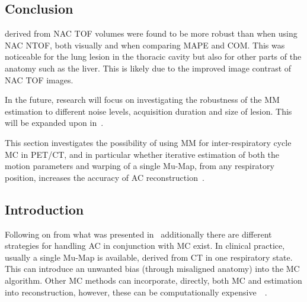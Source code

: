         \subsection{Conclusion} \label{sec:impact_of_tof_on_respiratory_motion_model_estimation_using_pre_gated_no_intra_cycle_motion_nac_pet_conclusion}
             derived from \gls{NAC} \gls{TOF} volumes were found to be more robust than when using \gls{NAC} \gls{NTOF}, both visually and when comparing \gls{MAPE} and \gls{COM}. This was noticeable for the lung lesion in the thoracic cavity but also for other parts of the anatomy such as the liver. This is likely due to the improved image contrast of \gls{NAC} \gls{TOF} images.

            In the future, research will focus on investigating the robustness of the \gls{MM} estimation to different noise levels, acquisition duration and size of lesion. This will be expanded upon in~.
    
        This section investigates the possibility of using \gls{MM} for inter-respiratory cycle \gls{MC} in \gls{PET}/\gls{CT}, and in particular whether iterative estimation of both the motion parameters and warping of a single \gls{Mu-Map}, from any respiratory position, increases the accuracy of \gls{AC} reconstruction~\parencite{Whitehead2020PET/CTFields}.
        
        \subsection{Introduction} \label{sec:pet_ct_respiratory_motion_correction_with_a_single_attenuation_map_using_nac_derived_deformation_fields_introduction}
            Following on from what was presented in~ additionally there are different strategies for handling \gls{AC} in conjunction with \gls{MC} exist. In clinical practice, usually a single \gls{Mu-Map} is available, derived from \gls{CT} in one respiratory state. This can introduce an unwanted bias (through misaligned anatomy) into the \gls{MC} algorithm. Other \gls{MC} methods can incorporate, directly, both \gls{MC} and  estimation into reconstruction, however, these can be computationally expensive~\parencite{Bousse2016a}~\parencite{Bousse2016}.
            
